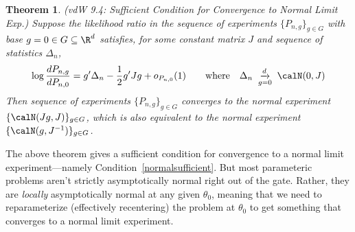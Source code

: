 \documentclass[12pt]{article}
\theoremstyle{plain}
\newtheorem{thm}{Theorem}[section]
\theoremstyle{definition}
\theoremstyle{remark}
\newcommand{\dto}{\xrightarrow{d}}
\begin{document}
\begin{thm}
\label{thm:limitnormal}
\emph{(vdW 9.4: Sufficient Condition for Convergence to Normal Limit Exp.)}
Suppose the likelihood ratio in the sequence of experiments
$\{P_{n,g}\}_{g\in G}$ with base $g=0\in G\subseteq \R^d$ satisfies, for
some constant matrix $J$ and sequence of statistics $\Delta_n$,
\begin{align}
  \log \frac{dP_{n,g}}{dP_{n,0}}
  =
  g'\Delta_n
  -
  \frac{1}{2}
  g' J g
  +
  o_{P_{n,0}}(1)
  \qquad\text{where}\quad
  \Delta_n
  \;\underset{g=0}{\dto}\;
  \calN(0,J)
  \label{normalsufficient}
\end{align}
Then sequence of experiments $\{P_{n,g}\}_{g\in G}$ converges to the
normal experiment $\{\calN(Jg,J)\}_{g\in G}$, which is also equivalent
to the normal experiment $\{\calN(g,J^{-1})\}_{g\in G}$.
\end{thm}


The above theorem gives a sufficient condition for convergence to a
normal limit experiment---namely Condition~\ref{normalsufficient}.
But most parameteric problems aren't strictly asymptotically normal
right out of the gate. Rather, they are \emph{locally} asymptotically
normal at any given $\theta_0$, meaning that we need to reparameterize
(effectively recentering) the problem at $\theta_0$ to get something
that converges to a normal limit experiment.
\end{document}
